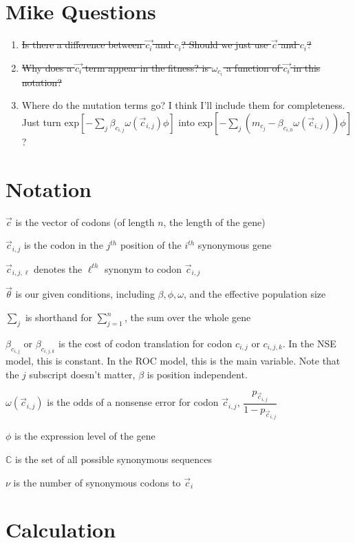\documentclass[11pt]{article} %
\begin{document}
\section{Mike Questions}
\begin{enumerate}
\item \sout{Is there a difference between $\vec{c_i}$ and $c_i$? Should we just use $\vec{c}$ and $c_i$?}
\item \sout{Why does a $\vec{c_i}$ term appear in the fitness? is $\omega_{c_i}$ a function of $\vec{c_i}$ in this notation?}
\item Where do the mutation terms go? I think I'll include them for completeness. Just turn
$\mbox{exp}\left[-\sum_{j} \beta_{c_{i,j}} \omega (\vec{c}_{i,j}) \phi \right]$
into
$\mbox{exp}\left[-\sum_{j} (m_{c_j} - \beta_{c_{i,0}} \omega (\vec{c}_{i,j})) \phi \right]$?
\end{enumerate}


\section{Notation}

$\vec{c}$ is the vector of codons (of length $n$, the length of the gene)

$\vec{c}_{i,j}$ is the codon in the $j^{th}$ position of the $i^{th}$ synonymous gene

$\vec{c}_{i,j,\ell}$ denotes the $\ell^{th}$ synonym to codon $\vec{c}_{i,j}$ 

$\vec{\theta}$ is our given conditions, including $\beta, \phi, \omega$, and the effective population size

$\sum_j$ is shorthand for $\sum_{j=1}^n$, the sum over the whole gene

$\beta_{c_{i,j}}$ or $\beta_{c_{i,j,k}}$ is the cost of codon translation for codon ${c_{i,j}}$ or ${c_{i,j,k}}$. In the NSE model, this is constant. In the ROC model, this is the main variable. Note that the $j$ subscript doesn't matter, $\beta$ is position independent.

$\omega(\vec{c}_{i,j})$ is the odds of a nonsense error for codon $\vec{c}_{i,j}$, $\dfrac{p_{\vec{c}_{i,j}}}{1-p_{\vec{c}_{i,j}}}$ 

$\phi$ is the expression level of the gene

$\mathbb{C}$ is the set of all possible synonymous sequences

$\nu$ is the number of synonymous codons to $\vec{c}_i$

\section{Calculation}
\end{document}
